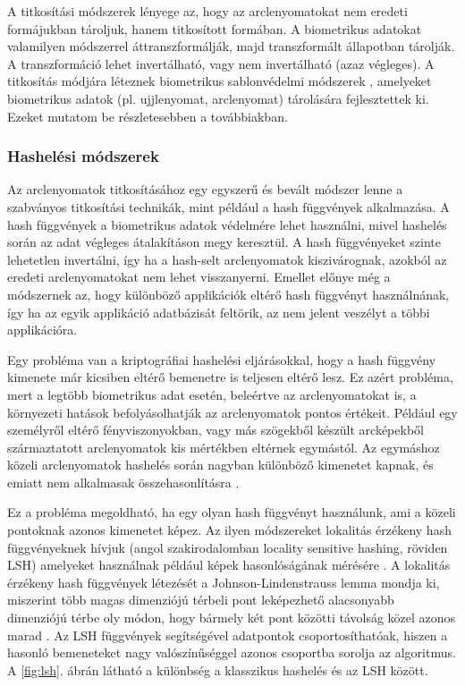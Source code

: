 A titkosítási módszerek lényege az, hogy az arclenyomatokat nem eredeti formájukban tároljuk, hanem titkosított formában. A biometrikus adatokat valamilyen módszerrel áttranszformálják, majd transzformált állapotban tárolják. A transzformáció lehet invertálható, vagy nem invertálható (azaz végleges). A titkosítás módjára léteznek biometrikus sablonvédelmi módszerek \cite{patel2015cancelable}, amelyeket biometrikus adatok (pl. ujjlenyomat, arclenyomat) tárolására fejlesztettek ki. Ezeket mutatom be részletesebben a továbbiakban.



\subsubsection{Hashelési módszerek}

Az arclenyomatok titkosításához egy egyszerű és bevált módszer lenne a szabványos titkosítási technikák, mint például a hash függvények alkalmazása. A hash függvények a biometrikus adatok védelmére lehet használni, mivel hashelés során az adat végleges átalakításon megy keresztül. A hash függvényeket szinte lehetetlen invertálni, így ha a hash-selt arclenyomatok kiszivárognak, azokból az eredeti arclenyomatokat nem lehet visszanyerni. Emellet előnye még a módszernek az, hogy különböző applikációk eltérő hash függvényt használnának, így ha az egyik applikáció adatbázisát feltörik, az nem jelent veszélyt a többi applikációra.

Egy probléma van a kriptográfiai hashelési eljárásokkal, hogy a hash függvény kimenete már kicsiben eltérő bemenetre is teljesen eltérő lesz. Ez azért probléma, mert a legtöbb biometrikus adat esetén, beleértve az arclenyomatokat is, a környezeti hatások befolyásolhatják az arclenyomatok pontos értékeit. Például egy személyről eltérő fényviszonyokban, vagy más szögekből készült arcképekből származtatott arclenyomatok kis mértékben eltérnek egymástól. Az egymáshoz közeli arclenyomatok hashelés során nagyban különböző kimenetet kapnak, és emiatt nem alkalmasak összehasonlításra \cite{patel2015cancelable}. 

Ez a probléma megoldható, ha egy olyan hash függvényt használunk, ami a közeli pontoknak azonos kimenetet képez. Az ilyen módszereket lokalitás érzékeny hash függvényeknek hívjuk (angol szakirodalomban locality sensitive hashing, röviden LSH) amelyeket használnak például képek hasonlóságának mérésére \cite{jing2008visualrank}. A lokalitás érzékeny hash függvények létezését a Johnson-Lindenstrauss lemma mondja ki, miszerint több magas dimenziójú térbeli pont leképezhető alacsonyabb dimenziójú térbe oly módon, hogy bármely két pont közötti távolság közel azonos marad  \cite{johnson1984extensions}. Az LSH függvények segítségével adatpontok csoportosíthatóak, hiszen a hasonló bemeneteket nagy valószínűséggel azonos csoportba sorolja az algoritmus. A \ref{fig:lsh}. ábrán látható a különbség a klasszikus hashelés és az LSH között.

